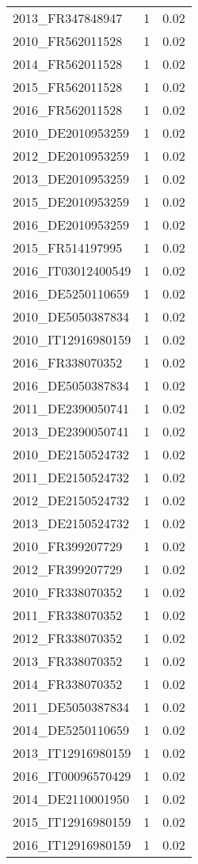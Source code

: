 \begin{table*}[htbp]
\begin{tabular}{lrr}
2013_FR347848947 & 1 & 0.02 \\
2010_FR562011528 & 1 & 0.02 \\
2014_FR562011528 & 1 & 0.02 \\
2015_FR562011528 & 1 & 0.02 \\
2016_FR562011528 & 1 & 0.02 \\
2010_DE2010953259 & 1 & 0.02 \\
2012_DE2010953259 & 1 & 0.02 \\
2013_DE2010953259 & 1 & 0.02 \\
2015_DE2010953259 & 1 & 0.02 \\
2016_DE2010953259 & 1 & 0.02 \\
2015_FR514197995 & 1 & 0.02 \\
2016_IT03012400549 & 1 & 0.02 \\
2016_DE5250110659 & 1 & 0.02 \\
2010_DE5050387834 & 1 & 0.02 \\
2010_IT12916980159 & 1 & 0.02 \\
2016_FR338070352 & 1 & 0.02 \\
2016_DE5050387834 & 1 & 0.02 \\
2011_DE2390050741 & 1 & 0.02 \\
2013_DE2390050741 & 1 & 0.02 \\
2010_DE2150524732 & 1 & 0.02 \\
2011_DE2150524732 & 1 & 0.02 \\
2012_DE2150524732 & 1 & 0.02 \\
2013_DE2150524732 & 1 & 0.02 \\
2010_FR399207729 & 1 & 0.02 \\
2012_FR399207729 & 1 & 0.02 \\
2010_FR338070352 & 1 & 0.02 \\
2011_FR338070352 & 1 & 0.02 \\
2012_FR338070352 & 1 & 0.02 \\
2013_FR338070352 & 1 & 0.02 \\
2014_FR338070352 & 1 & 0.02 \\
2011_DE5050387834 & 1 & 0.02 \\
2014_DE5250110659 & 1 & 0.02 \\
2013_IT12916980159 & 1 & 0.02 \\
2016_IT00096570429 & 1 & 0.02 \\
2014_DE2110001950 & 1 & 0.02 \\
2015_IT12916980159 & 1 & 0.02 \\
2016_IT12916980159 & 1 & 0.02 \\

\end{tabular}
\end{table*}
